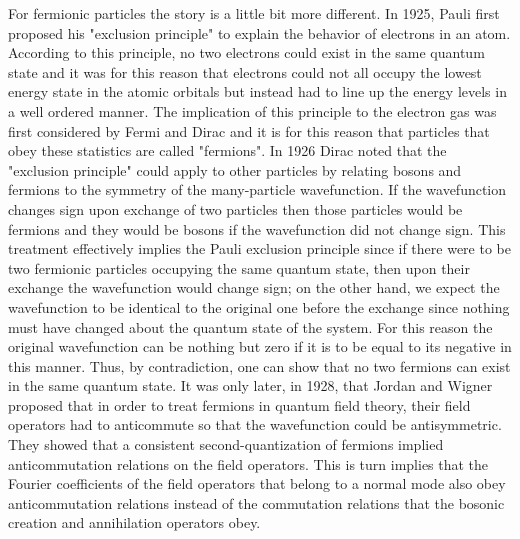 For fermionic particles the story is a little bit more different.
In 1925, Pauli first proposed his "exclusion principle" to explain the behavior of electrons in an atom. According to this principle, no two electrons could exist in the same quantum state and it was for this reason that electrons could not all occupy the lowest energy state in the atomic orbitals but instead had to line up the energy levels in a well ordered manner. The implication of this principle to the electron gas was first considered by Fermi and Dirac and it is for this reason that particles that obey these statistics are called "fermions". In 1926 Dirac noted that the "exclusion principle" could apply to other particles by relating bosons and fermions to the symmetry of the many-particle wavefunction. If the wavefunction changes sign upon exchange of two particles then those particles would be fermions and they would be bosons if the wavefunction did not change sign. This treatment effectively implies the Pauli exclusion principle since if there were to be two fermionic particles occupying the same quantum state, then upon their exchange the wavefunction would change sign; on the other hand, we expect the wavefunction to be identical to the original one before the exchange since nothing must have changed about the quantum state of the system. For this reason the original wavefunction can be nothing but zero if it is to be equal to its negative in this manner. Thus, by contradiction, one can show that no two fermions can exist in the same quantum state. It was only later, in 1928, that Jordan and Wigner proposed that in order to treat fermions in quantum field theory, their field operators had
to anticommute so that the wavefunction could be antisymmetric. They showed that a consistent second-quantization of fermions implied anticommutation relations on the field operators. This is turn implies that the Fourier coefficients of the field operators that belong to a normal mode also obey anticommutation relations instead of the commutation relations that the bosonic creation and annihilation operators obey.

